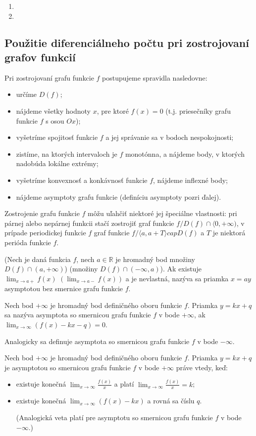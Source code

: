 \begin{enumerate}[resume]
	\item {}
	\item {}
\end{enumerate}

\subsection{Použitie diferenciálneho počtu pri zostrojovaní grafov funkcií}
Pri zostrojovaní grafu funkcie $f$ postupujeme spravidla nasledovne:
\begin{itemize}
\item určíme $D(f)$;
\item nájdeme všetky hodnoty $x$, pre ktoré $f(x)=0$ (t.j. priesečníky grafu funkcie $f$ s osou $Ox$);
\item vyšetríme spojitosť funkcie $f$ a jej správanie sa v bodoch nespokojnosti;
\item zistíme, na ktorých intervaloch je $f$ monotónna, a nájdeme body, v ktorých nadobúda lokálne extrémy;
\item vyšetríme konvexnosť a konkávnosť funkcie $f$, nájdeme inflexné body;
\item nájdeme asymptoty grafu funkcie (definíciu asymptoty pozri ďalej).
\end{itemize}
Zostrojenie grafu funkcie $f$ môžu uľahčiť niektoré jej špeciálne vlastnosti: pri párnej alebo nepárnej funkcii stačí zostrojiť graf funkcie $f/D(f)\cap \langle 0,+\infty)$, v prípade periodickej funkcie $f$ graf funkcie $f/\langle a,a+T\rangle cap D(f)$ a $T$ je niektorá perióda funkcie $f$.

(Nech je daná funkcia $f$, nech $a\in\mathbb{R}$ je hromadný bod množiny $D(f)\cap (a,+\infty)$) (množiny $D(f)\cap (-\infty,a)$). Ak existuje $\lim_{x\rightarrow a+}f(x)$  $(\lim_{x\rightarrow a-}f(x))$ a je nevlastná, nazýva sa priamka $x=ay$ asymptotou bez smernice grafu funkcie $f$.

Nech bod $+\infty$ je hromadný bod definičného oboru funkcie $f$. Priamka $y=kx+q$ sa nazýva asymptota so smernicou grafu funkcie $f$ v bode $+\infty$, ak $\lim_{x\rightarrow \infty}(f(x)-kx-q)=0$.

Analogicky sa definuje asymptota so smernicou grafu funkcie $f$ v bode $-\infty$.

\begin{veta}
Nech bod $+\infty$ je hromadný bod definičného oboru funkcie $f$. Priamka $y=kx+q$ je asymptotou so smernicou grafu funkcie $f$ v bode $+\infty$ práve vtedy, keď:
\begin{itemize}
\item existuje konečná $\lim_{x\rightarrow \infty} \frac{f(x)}{x}$ a platí $\lim_{x\rightarrow \infty} \frac{f(x)}{x}=k$;
\item existuje konečná $\lim_{x\rightarrow \infty} (f(x)-kx)$ a rovná sa číslu $q$.

(Analogická veta platí pre asymptotu so smernicou grafu funkcie $f$ v bode $-\infty$.)
\end{itemize}
\end{veta}

